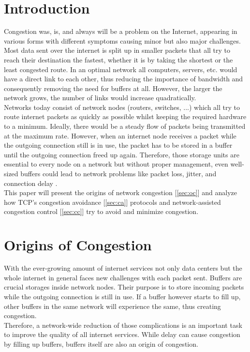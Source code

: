 \documentclass[a4paper,conference]{IEEEtran}
\begin{document}
\section{Introduction}
Congestion was, is, and always will be a problem on the Internet, appearing in various forms with different symptoms causing minor but also major challenges. Most data sent over the internet is split up in smaller packets that all try to reach their destination the fastest, whether it is by taking the shortest or the least congested route. In an optimal network all computers, servers, etc. would have a direct link to each other, thus reducing the importance of bandwidth and  consequently removing the need for buffers at all. However, the larger the network grows, the number of links would increase quadratically.
\\Networks today consist of network nodes (routers, switches, ...) which all try to route internet packets as quickly as possible whilst keeping the required hardware to a minimum. Ideally, there would be a steady flow of packets being transmitted at the maximum rate. However, when an internet node receives a packet while the outgoing connection still is in use, the packet has to be stored in a buffer until the outgoing connection freed up again. Therefore, those storage units are essential to every node on a network but without proper management, even well-sized buffers could lead to network problems like packet loss, jitter, and connection delay \cite{appenzeller2004sizing}.
\\This paper will present the origins of network congestion [\autoref{sec:oc}] and analyze how TCP's congestion avoidance [\autoref{sec:ca}] protocols and network-assisted congestion control [\autoref{sec:cc}] try to avoid and minimize congestion.

\section{Origins of Congestion}
\label{sec:oc}
With the ever-growing amount of internet services not only data centers but the whole internet in general faces new challenges with each packet sent. Buffers are crucial storages inside network nodes. Their purpose is to store incoming packets while the outgoing connection is still in use. If a buffer however starts to fill up, other buffers in the same network will experience the same, thus creating congestion.
\\Therefore, a network-wide reduction of those complications is an important task to improve the quality of all internet services. While delay can cause congestion by filling up buffers, buffers itself are also an origin of congestion.
\end{document}
